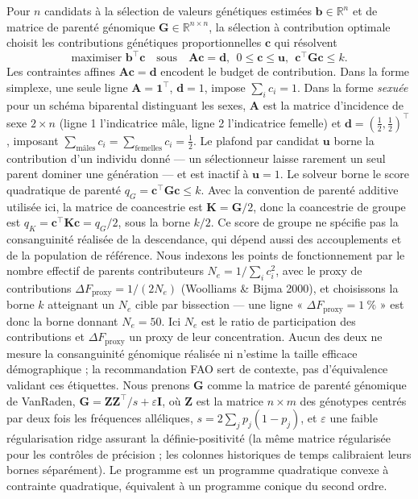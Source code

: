 \documentclass[11pt]{article}
\newcommand{\tp}{^{\top}}
\newcommand{\bc}{\mathbf{c}}
\newcommand{\bb}{\mathbf{b}}
\newcommand{\bG}{\mathbf{G}}
\newcommand{\bZ}{\mathbf{Z}}
\newcommand{\bA}{\mathbf{A}}
\newcommand{\bd}{\mathbf{d}}
\newcommand{\bu}{\mathbf{u}}
\begin{document}
Pour $n$ candidats à la sélection de valeurs génétiques estimées $\bb\in\mathbb{R}^n$ et de matrice de parenté génomique $\bG\in\mathbb{R}^{n\times n}$, la sélection à contribution optimale choisit les contributions génétiques proportionnelles $\bc$ qui résolvent
\[
  \text{maximiser } \bb\tp\bc \quad\text{sous}\quad \bA\bc=\bd,\ \ 0\le\bc\le\bu,\ \ \bc\tp\bG\bc\le k.
\]
Les contraintes affines $\bA\bc=\bd$ encodent le budget de contribution. Dans la forme simplexe, une seule ligne $\bA=\mathbf{1}\tp$, $\bd=1$, impose $\sum_i c_i = 1$. Dans la forme \emph{sexuée} pour un schéma biparental distinguant les sexes, $\bA$ est la matrice d'incidence de sexe $2\times n$ (ligne 1 l'indicatrice mâle, ligne 2 l'indicatrice femelle) et $\bd=(\tfrac12,\tfrac12)\tp$, imposant $\sum_{\text{mâles}} c_i = \sum_{\text{femelles}} c_i = \tfrac12$. Le plafond par candidat $\bu$ borne la contribution d'un individu donné --- un sélectionneur laisse rarement un seul parent dominer une génération --- et est inactif à $\bu=1$. Le solveur borne le score quadratique de parenté $q_G=\bc\tp\bG\bc\le k$. Avec la convention de parenté additive utilisée ici, la matrice de coancestrie est $\mathbf{K}=\bG/2$, donc la coancestrie de groupe est $q_K=\bc\tp\mathbf{K}\bc=q_G/2$, sous la borne $k/2$. Ce score de groupe ne spécifie pas la consanguinité réalisée de la descendance, qui dépend aussi des accouplements et de la population de référence. Nous indexons les points de fonctionnement par le nombre effectif de parents contributeurs $N_e=1/\sum_i c_i^2$, avec le proxy de contributions $\Delta F_{\mathrm{proxy}}=1/(2N_e)$ (Woolliams \& Bijma 2000), et choisissons la borne $k$ atteignant un $N_e$ cible par bissection --- une ligne « $\Delta F_{\mathrm{proxy}}=1~\%$ » est donc la borne donnant $N_e=50$. Ici $N_e$ est le ratio de participation des contributions et $\Delta F_{\mathrm{proxy}}$ un proxy de leur concentration. Aucun des deux ne mesure la consanguinité génomique réalisée ni n'estime la taille efficace démographique ; la recommandation FAO sert de contexte, pas d'équivalence validant ces étiquettes. Nous prenons $\bG$ comme la matrice de parenté génomique de VanRaden, $\bG=\bZ\bZ\tp/s+\varepsilon\mathbf{I}$, où $\bZ$ est la matrice $n\times m$ des génotypes centrés par deux fois les fréquences alléliques, $s=2\sum_j p_j(1-p_j)$, et $\varepsilon$ une faible régularisation ridge assurant la définie-positivité (la même matrice régularisée pour les contrôles de précision ; les colonnes historiques de temps calibraient leurs bornes séparément). Le programme est un programme quadratique convexe à contrainte quadratique, équivalent à un programme conique du second ordre.
\end{document}
